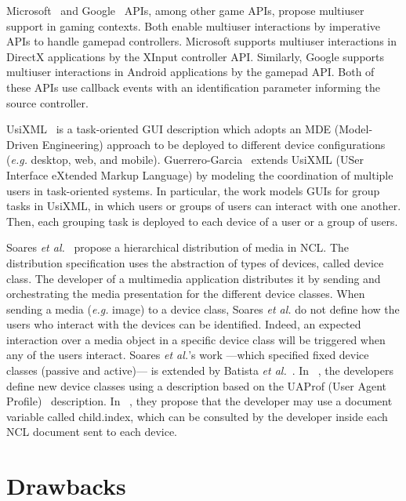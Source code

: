 \documentclass[
  doutorado,
  american
]{ThesisPUC}
\begin{document}
Microsoft~\cite{microsoft_getting_nodate} and 
Google~\cite{google_supporting_nodate} APIs, among other game
APIs, propose multiuser support in gaming contexts. Both enable multiuser
interactions by imperative APIs to handle gamepad controllers. Microsoft
supports multiuser interactions in DirectX applications by the XInput controller
API. Similarly, Google supports multiuser interactions in Android applications
by the gamepad API. Both of these APIs use callback events with an
identification parameter informing the source controller.

UsiXML~\cite{limbourg_usixml:_2005} is a task-oriented GUI description which 
adopts an MDE (Model-Driven Engineering) approach to be deployed to different 
device configurations (\textit{e.g.} desktop, web, and mobile). 
Guerrero-Garcia~\cite{guerrero_garcia_designing_2010} extends UsiXML (USer 
Interface eXtended Markup Language) by modeling the coordination of multiple 
users in task-oriented systems. In particular, the work models GUIs for group 
tasks in UsiXML, in which users or groups of users can interact with one 
another. Then, each grouping task is deployed to each device of a user or a 
group of users.

Soares \textit{et al.}~\cite{soares_multiple_2009} propose a hierarchical distribution
of media in NCL. The distribution specification uses the abstraction of types of
devices, called device class. The developer of a multimedia application
distributes it by sending and orchestrating the media presentation for the
different device classes. When sending a media (\textit{e.g.} image) to a device class,
Soares \textit{et al.} do not define how the users who interact with the devices can be
identified. Indeed, an expected interaction over a media object in a specific
device class will be triggered when any of the users interact. Soares 
\textit{et al.}’s
work —which specified fixed device classes (passive and active)— is extended by
Batista \textit{et al.}~\cite{batista_estendendo_2010,batista_ginga-md:_2013}. In
~\cite{batista_estendendo_2010}, the developers define new device classes using
a description based on the UAProf (User Agent
Profile)~\cite{openmobilealliance_wag_2001} description. In
~\cite{batista_ginga-md:_2013}, they propose that the developer may use a
document variable called child.index, which can be consulted by the developer
inside each NCL document sent to each device.

\section{Drawbacks}
\label{sec:state:drawbacks}
\end{document}
